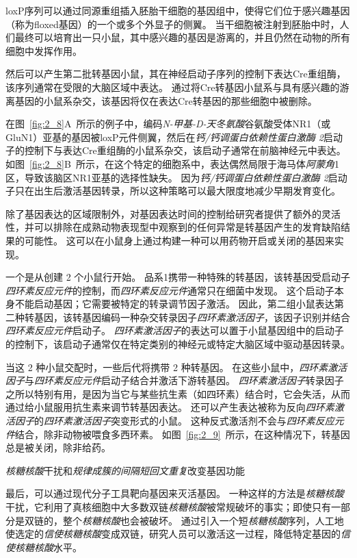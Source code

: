 \begin{proposition}[在实验动物中产生突变]
	\quad \quad loxP序列可以通过同源重组插入胚胎干细胞的基因组中，使得它们位于感兴趣基因（称为floxed基因）的一个或多个外显子的侧翼。
	当干细胞被注射到胚胎中时，人们最终可以培育出一只小鼠，其中感兴趣的基因是游离的，并且仍然在动物的所有细胞中发挥作用。
	
	\quad \quad 然后可以产生第二批转基因小鼠，其在神经启动子序列的控制下表达Cre重组酶，该序列通常在受限的大脑区域中表达。
	通过将Cre转基因小鼠系与具有感兴趣的游离基因的小鼠系杂交，该基因将仅在表达Cre转基因的那些细胞中被删除。
	
	\quad \quad 在图~\ref{fig:2_8}A~所示的例子中，编码\textit{N-甲基-D-天冬氨酸}谷氨酸受体NR1（或GluN1）亚基的基因被loxP元件侧翼，然后在\textit{钙/钙调蛋白依赖性蛋白激酶 2}启动子的控制下与表达Cre重组酶的小鼠系杂交，该启动子通常在前脑神经元中表达。
	如图~\ref{fig:2_8}B~所示，在这个特定的细胞系中，表达偶然局限于海马体\textit{阿蒙角}1区，导致该脑区NR1亚基的选择性缺失。
	因为\textit{钙/钙调蛋白依赖性蛋白激酶 2}启动子只在出生后激活基因转录，所以这种策略可以最大限度地减少早期发育变化。
	
	\quad \quad 除了基因表达的区域限制外，对基因表达时间的控制给研究者提供了额外的灵活性，并可以排除在成熟动物表现型中观察到的任何异常是转基因产生的发育缺陷结果的可能性。
	这可以在小鼠身上通过构建一种可以用药物开启或关闭的基因来实现。
	
	\quad \quad 一个是从创建 2 个小鼠行开始。
	品系1携带一种特殊的转基因，该转基因受启动子\textit{四环素反应元件}的控制，而\textit{四环素反应元件}通常只在细菌中发现。
	这个启动子本身不能启动基因；它需要被特定的转录调节因子激活。
	因此，第二组小鼠表达第二种转基因，该转基因编码一种杂交转录因子\textit{四环素激活因子}，该因子识别并结合\textit{四环素反应元件}启动子。
	\textit{四环素激活因子}的表达可以置于小鼠基因组中的启动子的控制下，该启动子通常仅在特定类别的神经元或特定大脑区域中驱动基因转录。
	
	\quad \quad 当这 2 种小鼠交配时，一些后代将携带 2 种转基因。
	在这些小鼠中，\textit{四环素激活因子}与\textit{四环素反应元件}启动子结合并激活下游转基因。
	\textit{四环素激活因子}转录因子之所以特别有用，是因为当它与某些抗生素（如四环素）结合时，它会失活，从而通过给小鼠服用抗生素来调节转基因表达。
	还可以产生表达被称为反向\textit{四环素激活因子}的\textit{四环素激活因子}突变形式的小鼠。
	这种反式激活剂不会与\textit{四环素反应元件}结合，除非动物被喂食多西环素。
	如图~\ref{fig:2_9}~所示，在这种情况下，转基因总是被关闭，除非给药。
	
	\quad \quad \textit{核糖核酸}干扰和\textit{规律成簇的间隔短回文重复}改变基因功能
	
	\quad \quad 最后，可以通过现代分子工具靶向基因来灭活基因。
	一种这样的方法是\textit{核糖核酸}干扰，它利用了真核细胞中大多数双链\textit{核糖核酸}被常规破坏的事实；即使只有一部分是双链的，整个\textit{核糖核酸}也会被破坏。
	通过引入一个短\textit{核糖核酸}序列，人工地使选定的\textit{信使核糖核酸}变成双链，研究人员可以激活这一过程，降低特定基因的\textit{信使核糖核酸}水平。
	
\end{proposition}


